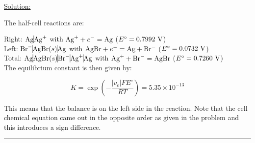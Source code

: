 \noindent
\underline{Solution:}

The half-cell reactions are:

Right: $\textnormal{Ag} \vline \textnormal{Ag}^+$ with $\textnormal{Ag}^+ + e^- = \textnormal{Ag}$ ($E^\circ = 0.7992\textnormal{ V}$)\\
Left: $\textnormal{Br}^- \vline \textnormal{AgBr}(s) \vline \textnormal{Ag}$ with $\textnormal{AgBr} + e^- = \textnormal{Ag} + \textnormal{Br}^-$ ($E^\circ = 0.0732\textnormal{ V}$)\\
Total: $\textnormal{Ag} \vline \textnormal{AgBr}(s) \vline \textnormal{Br}^- \vline \textnormal{Ag}^+ \vline \textnormal{Ag}$ with $\textnormal{Ag}^+ + \textnormal{Br}^- = \textnormal{AgBr}$ ($E^\circ = 0.7260\textnormal{ V}$)\\

The equilibrium constant is then given by:

$$K = \exp\left(-\frac{\left|v_e\right|FE^\circ}{RT}\right) = 5.35\times 10^{-13}$$

This means that the balance is on the left side in the reaction. Note that the cell chemical equation came out in the opposite order as given in the problem and this introduces a sign difference.

\hrule\vspace{0.5cm}

